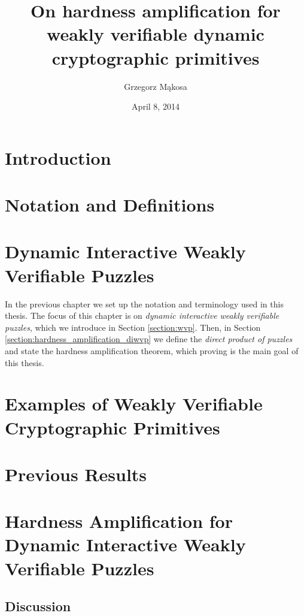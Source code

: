 \documentclass[11pt,a4paper,titlepage]{memoir}
\title{On hardness amplification for weakly verifiable dynamic cryptographic primitives}
\author{Grzegorz M\k{a}kosa}
\date{April 8, 2014}
\begin{document}
\frontmatter




\cleartorecto
\tableofcontents
\mainmatter

\chapter{Introduction}
\label{ch:introduction}

%
\chapter{Notation and Definitions}
\label{ch:preliminaries}

%
\chapter{Dynamic Interactive Weakly Verifiable Puzzles}
\label{ch:diwvp_main_thm}
In the previous chapter we set up the notation and terminology used in this thesis.
The focus of this chapter is on \textit{dynamic interactive weakly verifiable puzzles}, which we introduce in Section \ref{section:wvp}.
Then, in Section \ref{section:hardness_amplification_diwvp} we define the \textit{direct product of puzzles}
and state the hardness amplification theorem, which proving is the main goal of this thesis.
%

%
\chapter{Examples of Weakly Verifiable Cryptographic Primitives}
\label{ch:examples_wvcp}

%
\chapter{Previous Results}
\label{ch:previous_results}

%
\chapter{Hardness Amplification for Dynamic Interactive Weakly Verifiable Puzzles}
\label{ch:main_result}
%

%

%

%

%
\section{Discussion}
\label{ch:discussion}


\appendix


\backmatter



\end{document}
